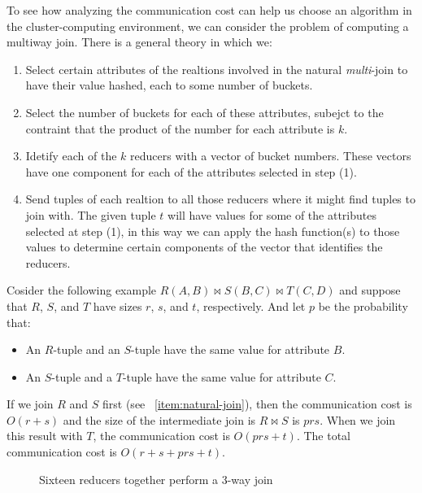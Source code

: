 To see how analyzing the communication cost can help us choose an algorithm in the cluster-computing environment, we can consider the problem of computing a multiway join. There is a general theory in which we:
\begin{enumerate}
    \item Select certain attributes of the realtions involved in the natural \textit{multi}-join to have their value hashed, each to some number of buckets.
    \item Select the number of buckets for each of these attributes, subejct to the contraint that the product of the number for each attribute is $k$.
    \item Idetify each of the $k$ reducers with a vector of bucket numbers. These vectors have one component for each of the attributes selected in step (1).
    \item Send tuples of each realtion to all those reducers where it might find tuples to join with. The given tuple $t$ will have values for some of the attributes selected at step (1), in this way we can apply the hash function(s) to those values to determine certain components of the vector that identifies the reducers. 
\end{enumerate}
Cosider the following example $R(A, B) \bowtie S(B, C) \bowtie T(C, D)$ and suppose that $R$, $S$, and $T$ have sizes $r$, $s$, and $t$, respectively. And let $p$ be the probability that:
\begin{itemize}
    \item An $R$-tuple and an $S$-tuple have the same value for attribute $B$.
    \item An $S$-tuple and a $T$-tuple have the same value for attribute $C$.
\end{itemize}
If we join $R$ and $S$ first (see ~\ref{item:natural-join}), then the communication cost is $O(r+s)$ and the size of the intermediate join is $R \bowtie S$ is $prs$. When we join this result with $T$, the communication cost is $O(prs+t)$. The total communication cost is $O(r+s+prs+t)$. 

\begin{figure}[H]
\centering
\scalebox{1}{
    
}
\caption{Sixteen reducers together perform a 3-way join}
\label{fig:3-way-join}
\end{figure}

